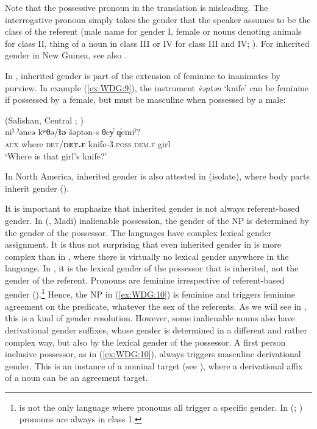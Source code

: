 \documentclass[output=collectionpaper]{langsci/langscibook}
\begin{document}
Note that the possessive pronoun in the  translation is misleading. The interrogative pronoun simply takes the gender that the speaker assumes to be the class of the referent (male name for gender I, female or nouns denoting animals for class II, thing of a noun in class III or IV for class III and IV; \citealt[187--188]{Olsson2017}). For inherited gender in New Guinea, see also \cite[177]{Fedden2011}.

In , inherited gender is part of the extension of feminine to inanimates by purview. In example (\ref{ex:WDG:9}), the instrument \textit{šəptən} `knife' can be feminine if possessed by a female, but must be masculine when possessed by a male:

\ea\label{ex:WDG:9}
 (Salishan, Central ; \citealt{Gerdts2013})\\
\gll niˀ	ˀəncə	kʷθə/\textbf{łə}	šəptən-s	θey̓	q̓emiˀ?\\
\textsc{aux}	where	\textsc{det}/\textbf{\textsc{det.f}}	knife-3.\textsc{poss}	\textsc{dem.f}	girl\\
\glt `Where is that girl's knife?'\\
\z

In North America, inherited gender is also attested in  (isolate), where body parts inherit gender (\citealt[23]{Swanton1921}).

It is important to emphasize that inherited gender is not always referent-based gender. In  (, Madi) inalienable possession, the gender of the NP is determined by the gender of the possessor. The  languages have complex lexical gender assignment. It is thus not surprising that even inherited gender in  is more complex than in , where there is virtually no lexical gender anywhere in the language. In , it is the lexical gender of the possessor that is inherited, not the gender of the referent. Pronouns are feminine irrespective of referent-based gender (\citealt[489]{Dixon2000}).\footnote{%
 is not the only language where pronouns all trigger a specific gender. In  (; ) pronouns are always in class 1.
} %
Hence, the NP in (\ref{ex:WDG:10}) is feminine and triggers feminine agreement on the predicate, whatever the sex of the referents. As we will see in , this is a kind of gender resolution. However, some inalienable nouns also have derivational gender suffixes, whose gender is determined in a different and rather complex way, but also by the lexical gender of the possessor. A first person inclusive possessor, as in (\ref{ex:WDG:10}), always triggers masculine derivational gender. This is an instance of a nominal target (see ), where a derivational affix of a noun can be an agreement target.
\end{document}
